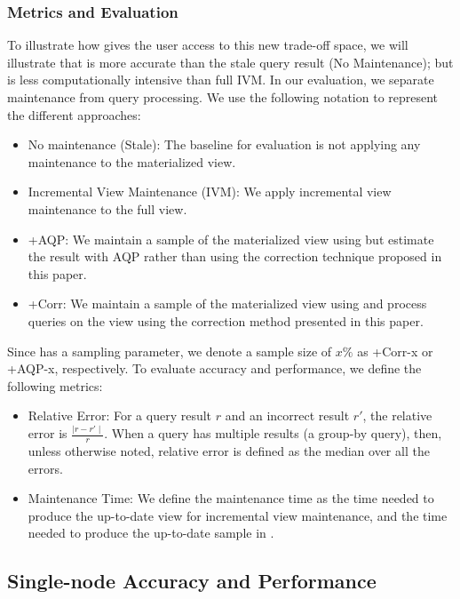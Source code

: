 \subsubsection{Metrics and Evaluation}
To illustrate how \svc gives the user access to this new trade-off space, we will illustrate that \svc is more accurate than the stale query result (No Maintenance); but is less computationally intensive than full IVM. 
In our evaluation, we separate maintenance from query processing.
We use the following notation to represent the different approaches:
\begin{itemize}[noitemsep]
\item No maintenance (Stale): The baseline for evaluation is not applying any maintenance to the materialized view.
\item Incremental View Maintenance (IVM): We apply incremental view maintenance to the full view.
\item \svcnospace+AQP: We maintain a sample of the materialized view using \svc but estimate the result with AQP rather than using 
the correction technique proposed in this paper.
\item \svcnospace+Corr: We maintain a sample of the materialized view using \svc and process queries on the view using the correction method presented in this paper.
\end{itemize}
Since \svc has a sampling parameter, we denote a sample size of $x \% $ as \svcnospace+Corr-x or \svcnospace+AQP-x, respectively. 
To evaluate accuracy and performance, we define the following metrics:
\begin{itemize}[noitemsep]
\item Relative Error: For a query result $r$ and an incorrect result $r'$, the relative error is $\frac{\mid r-r' \mid}{r}.$
When a query has multiple results (a group-by query), then, unless otherwise noted, relative error is defined as the median over all the errors.
\item Maintenance Time: We define the maintenance time as the time needed to produce the up-to-date view for incremental view maintenance, and the time needed to produce the up-to-date sample in \svc. 
\end{itemize}

\subsection{Single-node Accuracy and Performance}
\vspace{-.5em}
